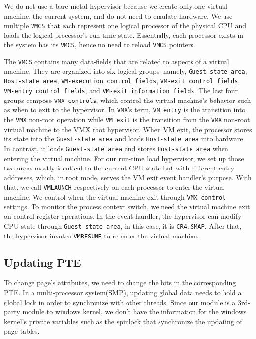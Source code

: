 We do not use a bare-metal hypervisor because we create only one virtual machine, the current system, and do not need to emulate hardware. We use multiple \texttt{VMCS} that each represent one logical processor of the physical CPU and loads the logical processor's run-time state. Essentially, each processor exists in the system has its \texttt{VMCS}, hence no need to reload \texttt{VMCS} pointers.

The \texttt{VMCS} contains many data-fields that are related to aspects of a virtual machine. They are organized into six logical groups, namely, \texttt{Guest-state area}, \texttt{Host-state area}, \texttt{VM-execution control fields}, \texttt{VM-exit control fields}, \texttt{VM-entry control fields}, and \texttt{VM-exit information fields}. The last four groups compose \texttt{VMX controls}, which control the virtual machine's behavior such as when to exit to the hypervisor. In \texttt{VMX}'s term, \texttt{VM entry} is the transition into the \texttt{VMX} non-root operation while \texttt{VM exit} is the transition from the \texttt{VMX} non-root virtual machine to the VMX root  hypervisor. When VM exit, the processor stores its state into the \texttt{Guest-state area} and loads \texttt{Host-state area} into hardware. In contrast, it loads \texttt{Guest-state area} and stores \texttt{Host-state area} when entering the virtual machine. For our run-time load hypervisor, we set up those two areas mostly identical to the current CPU state but with different entry addresses, which, in root mode, serves the VM exit event handler's purpose. With that, we call \texttt{VMLAUNCH} respectively on each processor to enter the virtual machine. We control when the virtual machine exit through \texttt{VMX control} settings. To monitor the process context switch, we need the virtual machine exit on control register operations. In the event handler, the hypervisor can modify CPU state through \texttt{Guest-state area}, in this case, it is \texttt{CR4.SMAP}. After that, the hypervisor invokes \texttt{VMRESUME} to re-enter the virtual machine.

\subsection{Updating PTE}

To change page's attributes, we need to change the bits in the corresponding PTE. In a multi-processor system(SMP), updating global data needs to hold a global lock in order to synchronize with other threads. Since our module is a 3rd-party module to windows kernel, we don't have the information for the windows kernel's private variables such as the spinlock that synchronize the updating of page tables. 

